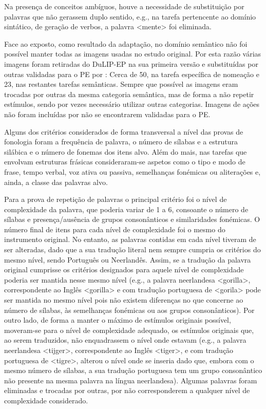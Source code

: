 \documentclass[output=paper,colorlinks,citecolor=brown,booklanguage=portuguese]{langscibook}
\begin{document}
Na presença de conceitos ambíguos, houve a necessidade de substituição por palavras que não gerassem duplo sentido, e.g., na tarefa pertencente ao domínio sintático, de geração de verbos, a palavra <mente> foi eliminada.

Face ao exposto, como resultado da adaptação, no domínio semântico não foi possível manter todas as imagens usadas no estudo original. Por esta razão várias imagens foram retiradas do DuLIP-EP na sua primeira versão e substituídas por outras validadas para o PE por \citet{Ventura2003}: Cerca de 50, na tarefa específica de nomeação e 23, nas restantes tarefas semânticas. Sempre que possível as imagens eram trocadas por outras da mesma categoria semântica, mas de forma a não repetir estímulos, sendo por vezes necessário utilizar outras categorias. Imagens de ações não foram incluídas por não se encontrarem validadas para o PE. 

Alguns dos critérios considerados de forma transversal a nível das provas de fonologia foram a frequência de palavra, o número de sílabas e a estrutura silábica e o número de fonemas dos itens alvo. Além do mais, nas tarefas que envolvam estruturas frásicas consideraram-se aspetos como o tipo e modo de frase, tempo verbal, voz ativa ou passiva, semelhanças fonémicas ou aliterações e, ainda, a classe das palavras alvo.

Para a prova de repetição de palavras o principal critério foi o nível de complexidade da palavra, que poderia variar de 1 a 6, consoante o número de sílabas e presença/ausência de grupos consonânticos e similaridades fonémicas. O número final de itens para cada nível de complexidade foi o mesmo do instrumento original. No entanto, as palavras contidas em cada nível tiveram de ser alteradas, dado que a sua tradução literal nem sempre cumpria os critérios do mesmo nível, sendo Português ou Neerlandês. Assim, se a tradução da palavra original cumprisse os critérios designados para aquele nível de complexidade poderia ser mantida nesse mesmo nível (e.g., a palavra neerlandesa <gorilla>, correspondente ao Inglês <gorilla> e com tradução portuguesa de <gorila> pode ser mantida no mesmo nível pois não existem diferenças no que concerne ao número de sílabas, às semelhanças fonémicas ou aos grupos consonânticos). Por outro lado, de forma a manter o máximo de estímulos originais possível, moveram-se para o nível de complexidade adequado, os estímulos originais que, ao serem traduzidos, não enquadrassem o nível onde estavam (e.g., a palavra neerlandesa <tijger>, correspondente ao Inglês <tiger>, e com tradução portuguesa de <tigre>, alterou o nível onde se inseria dado que, embora com o mesmo número de sílabas, a sua tradução portuguesa tem um grupo consonântico não presente na mesma palavra na língua neerlandesa). Algumas palavras foram eliminadas e trocadas por outras, por não corresponderem a qualquer nível de complexidade considerado.
\end{document}
